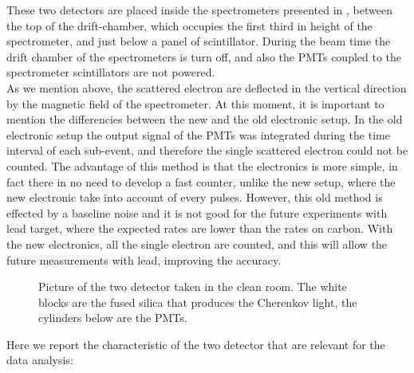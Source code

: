 These  two detectors are placed inside the spectrometers presented in , between the top of the drift-chamber, which occupies the first third in height of the spectrometer, and just below a panel of scintillator. During the beam time the drift chamber of the spectrometers is turn off, and also the PMTs coupled to the spectrometer scintillators are not powered.\\
As we mention above, the scattered electron are deflected in the vertical direction by the magnetic field of the spectrometer. 
At this moment, it is important to mention the differencies between the new and the old electronic setup. In the old electronic setup the output signal of the PMTs was integrated during the time interval of each sub-event, and therefore the single scattered electron could not be counted. The advantage of this method is that the electronics is more simple, in fact there in no need to develop a fast counter, unlike the new setup, where the new electronic take into account of every pulses. However, this old method is effected by a baseline noise and it is not good for the future experiments with lead target, where the expected rates are lower than the rates on carbon.
With the new electronics, all the single electron are counted, and this will allow the future measurements with lead, improving the accuracy. 

\begin{figure}[hbtp]
\centering
{} \quad
{} \quad
	\label{fig:Detectors}
\caption{Picture of the two detector taken in the clean room. The white blocks are the fused silica that produces the Cherenkov light, the cylinders below are the PMTs.}
\end{figure}

Here we report the characteristic of the two detector that are relevant for the data analysis: 

